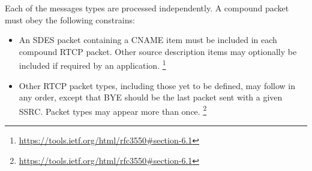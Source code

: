 Each of the messages types are processed independently.
A compound packet must obey the following constrains:

\begin{itemize}     
    \item An SDES packet containing a CNAME item must be included in each compound RTCP packet. Other source description items may optionally be included if required by an application. \footnote{\url{https://tools.ietf.org/html/rfc3550\#section-6.1}}
      
    \item Other RTCP packet types, including those yet to be defined, may follow in any order, except that BYE should be the last packet sent with a given SSRC. Packet types may appear more than once. \footnote{\url{https://tools.ietf.org/html/rfc3550\#section-6.1}}
\end{itemize}


